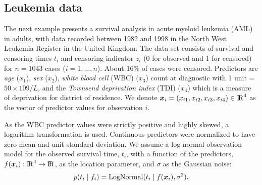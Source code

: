  
\subsection{Leukemia data}\label{sec_bf_caseVI}

The next example presents a survival analysis in acute myeloid leukemia (AML) in adults, with data recorded between 1982 and 1998 in the North West Leukemia Register in the United Kingdom. The data set consists of survival and censoring times $t_i$ and censoring indicator $z_i$ (0 for observed and 1 for censored) for $n=1043$ cases ($i=1,\dots,n$). About 16\% of cases were censored. Predictors are \textit{age} ($x_1$), \textit{sex} ($x_2$), \textit{white blood cell} (WBC) ($x_3$) count at diagnostic with 1 unit = $50\times109/L$, and the \textit{Townsend deprivation index} (TDI) ($x_4$) which is a measure of deprivation for district of residence. We denote $\bm{x}_i=(x_{i1},x_{i2},x_{i3},x_{i4}) \in {\rm I\!R}^{4}$ as the vector of predictor values for observation $i$.

As the WBC predictor values were strictly positive and highly skewed, a logarithm transformation is used. Continuous predictors were normalized to have zero mean and unit standard deviation.  
We assume a log-normal observation model for the observed survival time, $t_i$, with a function of the predictors, $f(\bm{x}_i):{\rm I\!R}^4 \to {\rm I\!R}$, as the location parameter, and $\sigma$ as the Gaussian noise: 
%
\begin{equation*}
  p(t_i \mid f_i)= \operatorname{LogNormal}(t_i \mid f(\bm{x}_i),\sigma^2).
\end{equation*}

